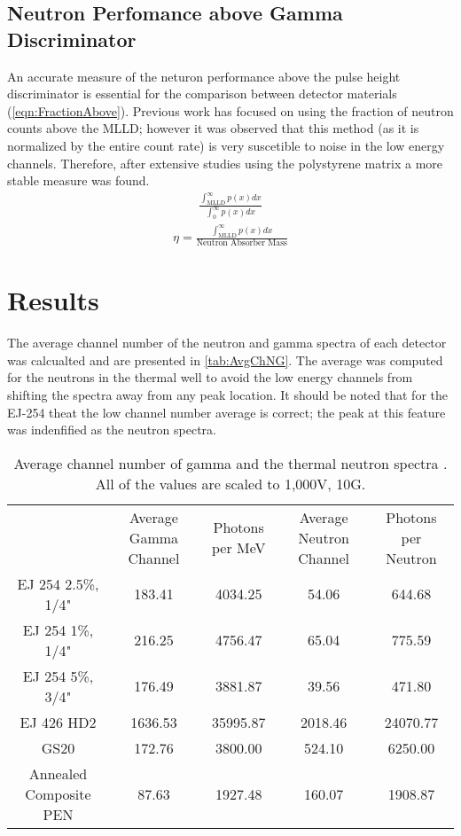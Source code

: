 \documentclass[draftcls,onecolumn]{IEEEtran}
\begin{document}
\subsection{Neutron Perfomance above Gamma Discriminator}
An accurate measure of the neturon performance above the pulse height discriminator is essential for the comparison between detector materials (\autoref{eqn:FractionAbove}).
Previous work has focused on using the fraction of neutron counts above the MLLD; however it was observed that this method (as it is normalized by the entire count rate) is very suscetible to noise in the low energy channels.
Therefore, after extensive studies using the polystyrene matrix a more stable measure was found.
\begin{align}
\label{eqn:FractionAbove}
\frac{\int_{\text{MLLD}}^\infty p(x)dx}{\int_0^\infty p(x)dx}
\end{align}
\begin{align}
\label{eqn:CountRateAbovePerMass}
\eta = \frac{\int_{\text{MLLD}}^\infty p(x)dx}{\text{Neutron Absorber Mass}}
\end{align}

\section{Results}

The average channel number of the neutron and gamma spectra of each detector was calcualted and are presented in \autoref{tab:AvgChNG}.
The average was computed for the neutrons in the thermal well to avoid the low energy channels from shifting the spectra away from any peak location.
It should be noted that for the EJ-254 theat the low channel number average is correct; the peak at this feature was indenfified as the neutron spectra.
\begin{table}
\caption[Average Channel Number of Gamma and Neutron Spectra]{Average channel number of gamma and the thermal neutron spectra .  All of the values are scaled to 1,000V, 10G.}
\begin{tabular}{c| c c c c}
	& Average Gamma Channel	& Photons per MeV & Average Neutron Channel & Photons per Neutron\\
EJ 254 2.5\%, 1/4"&	183.41	&	4034.25	&	54.06	&	644.68	\\
EJ 254 1\%, 1/4"&	216.25	&	4756.47	&	65.04	&	775.59	\\
EJ 254 5\%, 3/4"&	176.49	&	3881.87	&	39.56	&	471.80	\\
EJ 426 HD2&	1636.53	&	35995.87	&	2018.46	&	24070.77	\\
GS20 &	172.76	&	3800.00	&	524.10	&	6250.00	\\
Annealed Composite PEN&	87.63	&	1927.48	&	160.07	&	1908.87	\\
\end{tabular}
\end{table}
\end{document}
